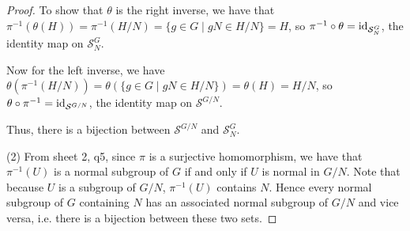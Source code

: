 \begin{proof}
To show that \( \theta \) is the right inverse, we have that \( \pi^{-1}(\theta(H)) = \pi^{-1}(H/N) = \{g \in G \mid gN \in H/N\} = H \), so \( \pi^{-1} \circ \theta = \mathrm{id}_{\mathcal{S}^{G}_N} \), the identity map on \( \mathcal{S}^{G}_N \).

Now for the left inverse, we have \( \theta(\pi^{-1}(H/N)) = \theta(\{g \in G \mid gN \in H/N\}) = \theta(H) = H/N \), so \( \theta \circ \pi^{-1} = \mathrm{id}_{\mathcal{S}^{G/N}} \), the identity map on \( \mathcal{S}^{G/N} \).

 Thus, there is a bijection between \( \mathcal{S}^{G/N} \) and \( \mathcal{S}^{G}_N \).


(2) From sheet 2, q5, since $\pi$ is a surjective homomorphism, we have that $\pi^{-1}(U)$ is a normal subgroup of $G$ if and only if $U$ is normal in $G/N.$ 
Note that because $U$ is a subgroup of $G/N$, $\pi^{-1}(U)$ contains $N$. Hence every normal subgroup of $G$ containing $N$ has an associated normal subgroup of $G/N$ and vice versa, i.e. there is a bijection between these two sets.
\end{proof}



